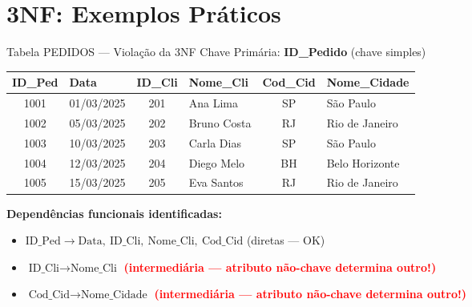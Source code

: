 \documentclass[9pt]{beamer}
\begin{document}
\section{3NF: Exemplos Práticos}

\begin{frame}{Tabela PEDIDOS — Violação da 3NF}
\small
Chave Primária: \textbf{ID\_Pedido} \quad (chave simples)

\vspace{0.2cm}
\centering
\begin{tabular}{|c|l|c|l|c|l|}
  \hline
  \textbf{ID\_Ped} & \textbf{Data} & \textbf{ID\_Cli} & \textbf{Nome\_Cli} & \textbf{Cod\_Cid} & \textbf{Nome\_Cidade} \\ \hline
  1001 & 01/03/2025 & 201 & Ana Lima     & SP & \color{red}São Paulo \\ \hline
  1002 & 05/03/2025 & 202 & Bruno Costa  & RJ & \color{red}Rio de Janeiro \\ \hline
  1003 & 10/03/2025 & 203 & Carla Dias   & SP & \color{red}São Paulo \\ \hline
  1004 & 12/03/2025 & 204 & Diego Melo   & BH & \color{red}Belo Horizonte \\ \hline
  1005 & 15/03/2025 & 205 & Eva Santos   & RJ & \color{red}Rio de Janeiro \\ \hline
\end{tabular}

\vspace{0.4cm}
\flushleft
\textbf{Dependências funcionais identificadas:}
\begin{itemize}
  \item $\text{ID\_Ped} \to \text{Data},\ \text{ID\_Cli},\ \text{Nome\_Cli},\ \text{Cod\_Cid}$ \quad \textcolor{green!60!black}{(diretas — OK)}
  \item $\text{ID\_Cli} \to \text{Nome\_Cli}$ \quad \textcolor{red}{\textbf{(intermediária — atributo não-chave determina outro!)}}
  \item $\text{Cod\_Cid} \to \text{Nome\_Cidade}$ \quad \textcolor{red}{\textbf{(intermediária — atributo não-chave determina outro!)}}
\end{itemize}
\end{frame}
\end{document}
